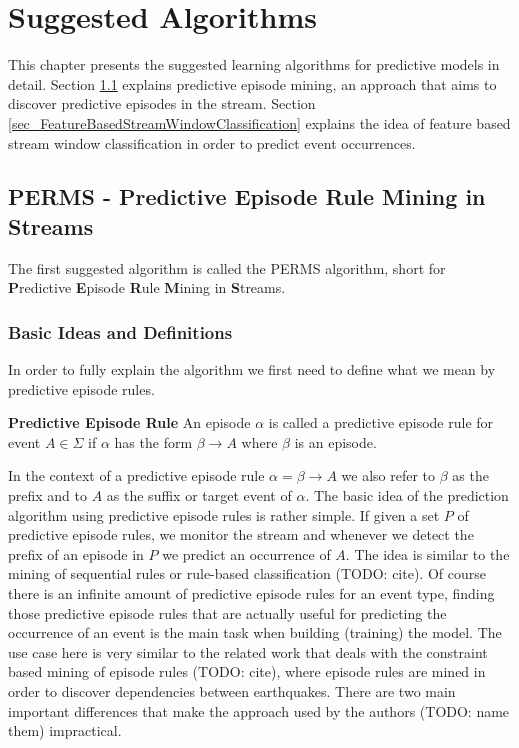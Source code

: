 \chapter{Suggested Algorithms}
\label{chapter_solutions}

\ifpdf
    \graphicspath{{Chapter4/Figs/Raster/}{Chapter4/Figs/PDF/}{Chapter4/Figs/}}
\else
    \graphicspath{{Chapter4/Figs/Vector/}{Chapter4/Figs/}}
\fi

This chapter presents the suggested learning algorithms for predictive models in detail. Section \ref{sec_predictiveEpisodeMining} explains predictive episode mining, an approach that aims to discover predictive episodes in the stream. Section \ref{sec_FeatureBasedStreamWindowClassification} explains the idea of feature based stream window classification in order to predict event occurrences. 

\section{PERMS - Predictive Episode Rule Mining in Streams}
\label{sec_predictiveEpisodeMining}
The first suggested algorithm is called the PERMS algorithm, short for \textbf{P}redictive \textbf{E}pisode \textbf{R}ule \textbf{M}ining in \textbf{S}treams.

\subsection{Basic Ideas and Definitions}
In order to fully explain the algorithm we first need to define what we mean by predictive episode rules.

\begin{mydef}
\label{def_predictiveEpisode}
\textbf{Predictive Episode Rule} An episode $\alpha$ is called a predictive episode rule for event $A \in \Sigma$ if $\alpha$ has the form $\beta \rightarrow A$ where $\beta$ is an episode. 
\end{mydef}

In the context of a predictive episode rule $\alpha = \beta \rightarrow A$ we also refer to $\beta$ as the prefix and to $A$ as the suffix or target event of $\alpha$. 
The basic idea of the prediction algorithm using predictive episode rules is rather simple. If given a set $P$ of predictive episode rules, we monitor the stream and whenever we detect the prefix of an episode in $P$ we predict an occurrence of $A$. The idea is similar to the mining of sequential rules or rule-based classification (TODO: cite).
Of course there is an infinite amount of predictive episode rules for an event type, finding those predictive episode rules that are actually useful for predicting the occurrence of an event is the main task when building (training) the model. The use case here is very similar to the related work that deals with the constraint based mining of episode rules (TODO: cite), where episode rules are mined in order to discover dependencies between earthquakes. There are two main important differences that make the approach used by the authors (TODO: name them) impractical.

